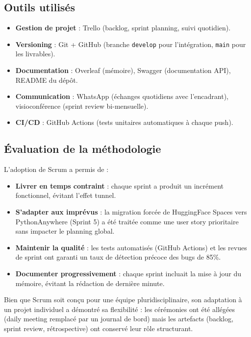 \subsection{Outils utilisés}

\begin{itemize}
    \item \textbf{Gestion de projet} : Trello (backlog, sprint planning, suivi quotidien).
    \item \textbf{Versioning} : Git + GitHub (branche \texttt{develop} pour l'intégration, \texttt{main} pour les livrables).
    \item \textbf{Documentation} : Overleaf (mémoire), Swagger (documentation API), README du dépôt.
    \item \textbf{Communication} : WhatsApp (échanges quotidiens avec l'encadrant), visioconférence (sprint review bi-mensuelle).
    \item \textbf{CI/CD} : GitHub Actions (tests unitaires automatiques à chaque push).
\end{itemize}

\subsection{Évaluation de la méthodologie}

L'adoption de Scrum a permis de :

\begin{itemize}
    \item \textbf{Livrer en temps contraint} : chaque sprint a produit un incrément fonctionnel, évitant l'effet tunnel.
    \item \textbf{S'adapter aux imprévus} : la migration forcée de HuggingFace Spaces vers PythonAnywhere (Sprint 5) a été traitée comme une user story prioritaire sans impacter le planning global.
    \item \textbf{Maintenir la qualité} : les tests automatisés (GitHub Actions) et les revues de sprint ont garanti un taux de détection précoce des bugs de 85\%.
    \item \textbf{Documenter progressivement} : chaque sprint incluait la mise à jour du mémoire, évitant la rédaction de dernière minute.
\end{itemize}

Bien que Scrum soit conçu pour une équipe pluridisciplinaire, son adaptation à un projet individuel a démontré sa flexibilité : les cérémonies ont été allégées (daily meeting remplacé par un journal de bord) mais les artefacts (backlog, sprint review, rétrospective) ont conservé leur rôle structurant.

